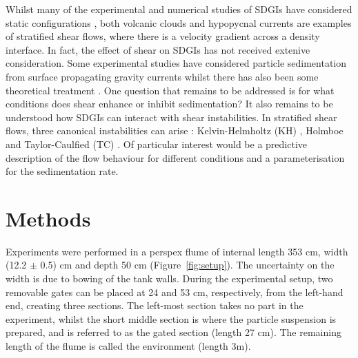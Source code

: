 \documentclass[authoryear,preprint,review,12pt]{elsarticle}
\begin{document}
Whilst many of the experimental and numerical studies of SDGIs have considered static configurations \citep{Chen97, Hoyal99, Blanchette05, Yu14, Burns15, Manzella15, Rouhnia15, Jazi16, Scollo17}, both volcanic clouds and hypopycnal currents are examples of stratified shear flows, where there is a velocity gradient across a density interface. In fact, the effect of shear on SDGIs has not received extenive consideration. Some experimental studies have considered particle sedimentation from surface propagating gravity currents \citep{Maxworthy99, Parsons01, McCool04, Sutherland18, Jazi19} whilst there has also been some theoretical treatment \citep{Farenzena17, Konopliv18}. One question that remains to be addressed is for what conditions does shear enhance or inhibit sedimentation? It also remains to be understood how SDGIs can interact with shear instabilities. In stratified shear flows, three canonical instabilities can arise \citep{Eaves19}: Kelvin-Helmholtz (KH) \citep{Helmholtz68, Kelvin71}, Holmboe \citep{Holmboe62} and Taylor-Caulfied (TC) \citep{Taylor31, Caulfield95}. Of particular interest would be a predictive description of the flow behaviour for different conditions and a parameterisation for the sedimentation rate.
  
\section{Methods}
\label{sec:method}

Experiments were performed in a perspex flume of internal length 353 cm, width (12.2 $\pm$ 0.5) cm and depth 50 cm (Figure~\ref{fig:setup}). The uncertainty on the width is due to bowing of the tank walls. During the experimental setup, two removable gates can be placed at 24 and 53 cm, respectively, from the left-hand end, creating three sections. The left-most section takes no part in the experiment, whilst the short middle section is where the particle suspension is prepared, and is referred to as the gated section (length 27 cm). The remaining length of the flume is called the environment (length 3m).
\end{document}
